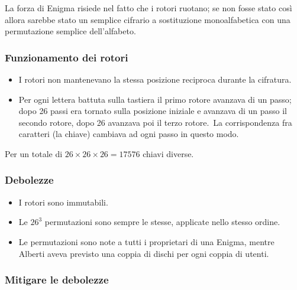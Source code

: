 La forza di Enigma risiede nel fatto che i rotori ruotano; se non fosse stato così allora sarebbe stato un semplice cifrario a sostituzione monoalfabetica con una permutazione semplice dell'alfabeto.

\subsubsection{Funzionamento dei rotori}

\begin{itemize}
    \item I rotori non mantenevano la stessa posizione reciproca durante la cifratura.
    \item Per ogni lettera battuta sulla tastiera il primo rotore avanzava di un passo; dopo 26 passi era tornato sulla posizione iniziale e avanzava di un passo il secondo rotore, dopo 26 avanzava poi il terzo rotore.\ La corrispondenza fra caratteri (la chiave) cambiava ad ogni passo in questo modo.
\end{itemize}

\noindent Per un totale di $26\times 26 \times 26 = 17576$ chiavi diverse.\

\subsubsection{Debolezze}

\begin{itemize}
    \item I rotori sono immutabili.
    \item Le $26^3$ permutazioni sono sempre le stesse, applicate nello stesso ordine.
    \item Le permutazioni sono note a tutti i proprietari di una Enigma, mentre Alberti aveva previsto una coppia di dischi per ogni coppia di utenti.
\end{itemize}

\subsubsection{Mitigare le debolezze}

